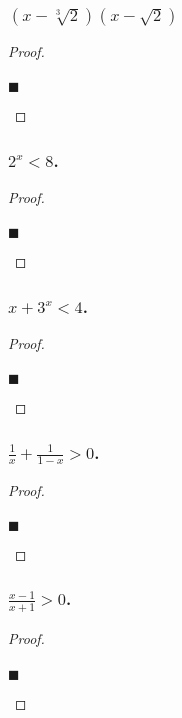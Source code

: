 \documentclass[letterpaper, 10 pt, conference]{ieeeconf}  %
\begin{document}
\subsubsection{\textbf{$(x - \sqrt[3]{2})(x - \sqrt{2})$}}
\begin{proof}
\begin{align}
    
\end{align}
\begin{flushright}
$\blacksquare$
\end{flushright}
\end{proof}

\subsubsection{\textbf{$2^x < 8$.}}
\begin{proof}
\begin{align}
    
\end{align}
\begin{flushright}
$\blacksquare$
\end{flushright}
\end{proof}

\subsubsection{\textbf{$x + 3^x < 4$.}}
\begin{proof}
\begin{align}
    
\end{align}
\begin{flushright}
$\blacksquare$
\end{flushright}
\end{proof}

\subsubsection{\textbf{$\frac{1}{x} + \frac{1}{1 - x} > 0$.}}
\begin{proof}
\begin{align}
    
\end{align}
\begin{flushright}
$\blacksquare$
\end{flushright}
\end{proof}

\subsubsection{\textbf{$\frac{x -1}{x + 1} > 0$.}}
\begin{proof}
\begin{align}
    
\end{align}
\begin{flushright}
$\blacksquare$
\end{flushright}
\end{proof}
\end{document}

